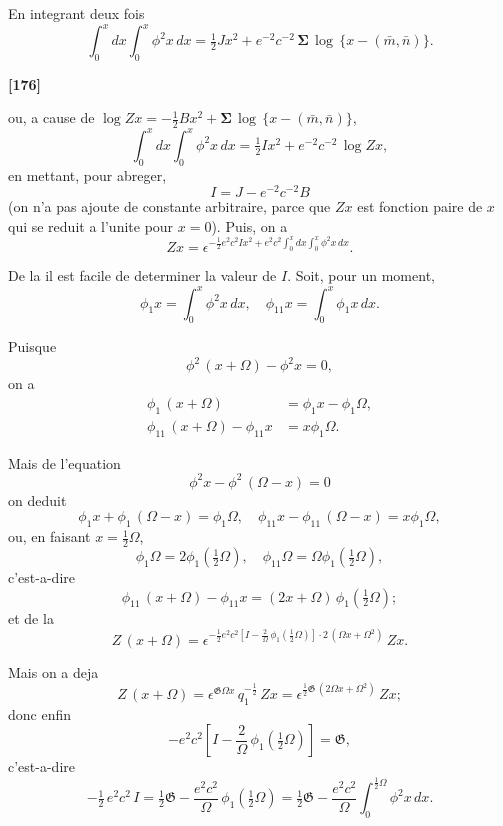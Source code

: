 \documentclass[11pt,a4paper]{article}
\begin{document}
En integrant deux fois
\begin{equation}
\int_0^x dx \int_0^x \phi^2 x\, dx = \tfrac{1}{2}Jx^2 + e^{-2} c^{-2}\, \boldsymbol{\Sigma}\, \log\, \{x - (\bar{m}, \bar{n})\}. \tag{41}
\end{equation}

\textbf{[176]}

ou, a cause de $\log Zx = -\frac{1}{2}Bx^2 + \boldsymbol{\Sigma}\, \log\, \{x - (\bar{m}, \bar{n})\}$,
\begin{equation}
\int_0^x dx \int_0^x \phi^2 x\, dx = \tfrac{1}{2}Ix^2 + e^{-2} c^{-2}\, \log Zx, \tag{42}
\end{equation}
en mettant, pour abreger,
\[I = J - e^{-2} c^{-2} B\]
(on n'a pas ajoute de constante arbitraire, parce que $Zx$ est fonction paire de $x$ qui se
reduit a l'unite pour $x = 0$). Puis, on a
\begin{equation}
Zx = \epsilon^{-\frac{1}{2}e^2 c^2 Ix^2 + e^2 c^2 \int_0^x dx \int_0^x \phi^2 x\, dx}. \tag{43}
\end{equation}

De la il est facile de determiner la valeur de $I$. Soit, pour un moment,
\[\phi_1 x = \int_0^x \phi^2 x\, dx,\quad \phi_{11} x = \int_0^x \phi_1 x\, dx.\]

Puisque
\[\phi^2\, (x + \Omega) - \phi^2 x = 0,\]
on a
\begin{align*}
\phi_1\, (x + \Omega) &= \phi_1 x - \phi_1 \Omega,\\
\phi_{11}\, (x + \Omega) - \phi_{11} x &= x\phi_1 \Omega.
\end{align*}

Mais de l'equation
\[\phi^2 x - \phi^2\, (\Omega - x) = 0\]
on deduit
\[\phi_1 x + \phi_1\, (\Omega - x) = \phi_1 \Omega,\quad \phi_{11} x - \phi_{11}\, (\Omega - x) = x\phi_1 \Omega,\]
ou, en faisant $x = \frac{1}{2}\Omega$,
\[\phi_1 \Omega = 2\phi_1\left(\tfrac{1}{2}\Omega\right),\quad \phi_{11} \Omega = \Omega\phi_1\left(\tfrac{1}{2}\Omega\right),\]
c'est-a-dire
\[\phi_{11}\, (x + \Omega) - \phi_{11} x = (2x + \Omega)\, \phi_1\left(\tfrac{1}{2}\Omega\right);\]
et de la
\[Z\, (x + \Omega) = \epsilon^{-\frac{1}{2}e^2 c^2\left[I - \frac{2}{\Omega}\, \phi_1\left(\frac{1}{2}\Omega\right)\right] \cdot 2\, (\Omega x + \Omega^2)}\, Zx.\]

Mais on a deja
\[Z\, (x + \Omega) = \epsilon^{\mathfrak{G}\Omega x}\, q_1^{-\frac{1}{2}}\, Zx = \epsilon^{\frac{1}{2}\mathfrak{G}\, (2\Omega x + \Omega^2)}\, Zx;\]
donc enfin
\[-e^2 c^2 \left[I - \frac{2}{\Omega}\, \phi_1\left(\tfrac{1}{2}\Omega\right)\right] = \mathfrak{G},\]
c'est-a-dire
\begin{equation}
-\tfrac{1}{2}\, e^2 c^2\, I = \tfrac{1}{2}\mathfrak{G} - \frac{e^2 c^2}{\Omega}\, \phi_1\left(\tfrac{1}{2}\Omega\right) = \tfrac{1}{2}\mathfrak{G} - \frac{e^2 c^2}{\Omega} \int_0^{\frac{1}{2}\Omega} \phi^2 x\, dx. \tag{44}
\end{equation}
\end{document}
